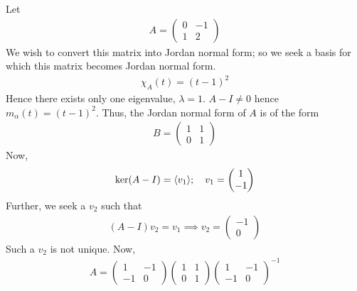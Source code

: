 \begin{example}
	Let
	\begin{align*}
		A = \begin{pmatrix}
			0 & -1 \\
			1 & 2
		\end{pmatrix}
	\end{align*}
	We wish to convert this matrix into Jordan normal form; so we seek a basis for which this matrix becomes Jordan normal form.
	\begin{align*}
		\chi_A(t) = (t-1)^2
	\end{align*}
	Hence there exists only one eigenvalue, $\lambda = 1$.
	$A - I \neq 0$ hence $m_\alpha(t) = (t-1)^2$.
	Thus, the Jordan normal form of $A$ is of the form
	\begin{align*}
		B = \begin{pmatrix}
			1 & 1 \\
			0 & 1
		\end{pmatrix}
	\end{align*}
	Now,
	\begin{align*}
		\ker(A - I) = \langle{} v_1 \rangle;\quad v_1 = \begin{pmatrix}
			1 \\ -1
		\end{pmatrix}
	\end{align*}
	Further, we seek a $v_2$ such that
	\begin{align*}
		(A - I)v_2 = v_1 \implies v_2 = \begin{pmatrix}
			-1 \\ 0
		\end{pmatrix}
	\end{align*}
	Such a $v_2$ is not unique.
	Now,
	\begin{align*}
		A = \begin{pmatrix}
			1  & -1 \\
			-1 & 0
		\end{pmatrix}
		\begin{pmatrix}
			1 & 1 \\
			0 & 1
		\end{pmatrix}
		\begin{pmatrix}
			1  & -1 \\
			-1 & 0
		\end{pmatrix}^{-1}
	\end{align*}
\end{example}

